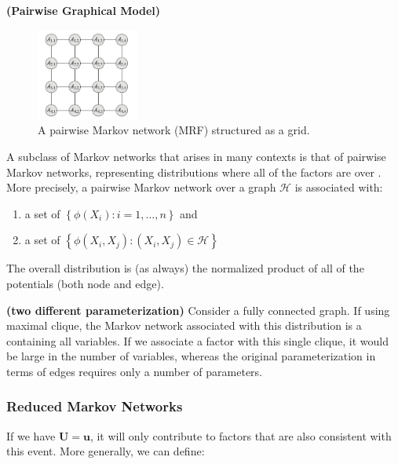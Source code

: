 \documentclass{article}
\newcommand{\bfs}[1]{\textbf{({#1}) }}
\begin{document}
\begin{exma}\bfs{Pairwise Graphical Model}
\begin{figure}[H]
    \centering
    \includegraphics[width=0.3\textwidth]{Figs/a16.png}
    \caption{A pairwise Markov network (MRF) structured as a grid.}
    \label{fig:xfaserd}
\end{figure}
A subclass of Markov networks that arises in many contexts is that of pairwise Markov networks, representing distributions where all of the factors are over . More precisely, a pairwise Markov network over a graph $\mathcal{H}$ is associated with:
\begin{enumerate}
    \item a set of  $\left\{\phi\left(X_{i}\right): i=1, \ldots, n\right\}$ and 
    \item a set of  $\left\{\phi\left(X_{i}, X_{j}\right):\left(X_{i}, X_{j}\right) \in \mathcal{H}\right\}$
\end{enumerate}The overall distribution is (as always) the normalized product of all of the potentials (both node and edge).
\end{exma}
\begin{exma}\bfs{two different parameterization}\label{ex:idkkac}
Consider a fully connected graph.
If using maximal clique, the Markov network associated with this distribution is a  containing all variables. If we associate a factor with this single clique, it would be  large in the number of variables, whereas the original parameterization in terms of edges requires only a  number of parameters. 
\end{exma}
\subsubsection{Reduced Markov Networks}
If we have  $\boldsymbol{U}=\boldsymbol{u}$, it will only contribute to factors that are also consistent with this event.
More generally, we can define:
\end{document}
